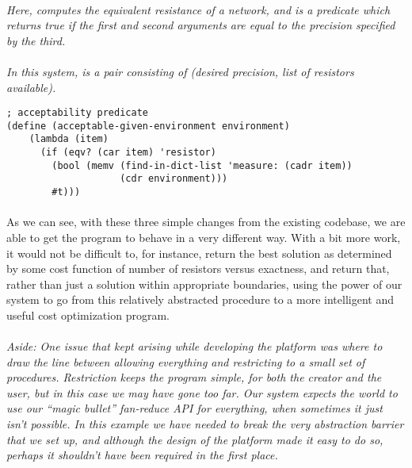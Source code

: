 \paragraph{}
\textit{Here,  computes the equivalent resistance of a network, and  is a predicate which returns true if the first and second arguments are equal to the precision specified by the third.}

\paragraph{}
\textit{In this system,  is a pair consisting of (desired precision, list of resistors available).}


\begin{verbatim}
; acceptability predicate
(define (acceptable-given-environment environment)
    (lambda (item)
      (if (eqv? (car item) 'resistor)
        (bool (memv (find-in-dict-list 'measure: (cadr item))
                    (cdr environment)))
        #t)))
\end{verbatim}

\paragraph{}
As we can see, with these three simple changes from the existing codebase, we are able to get the program to behave in a very different way. With a bit more work, it would not be difficult to, for instance, return the best solution as determined by some cost function of number of resistors versus exactness, and return that, rather than just a solution within appropriate boundaries, using the power of our system to go from this relatively abstracted  procedure to a more intelligent and useful cost optimization program.

\paragraph{}
\textit{Aside: One issue that kept arising while developing the platform was where to draw the line between allowing everything and restricting to a small set of procedures. Restriction keeps the program simple, for both the creator and the user, but in this case we may have gone too far. Our system expects the world to use our ``magic bullet'' fan-reduce API for everything, when sometimes it just isn't possible. In this example we have needed to break the very abstraction barrier that we set up, and although the design of the platform made it easy to do so, perhaps it shouldn't have been required in the first place.}

